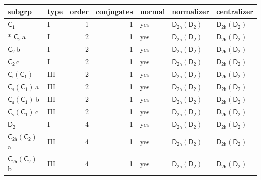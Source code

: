 \documentclass[10pt,a4paper]{article}
\numberwithin{equation}{section}
\newcommand{\grp}[1]{\mathsf{#1}}
\newcommand{\clsletter}[1]{\,{\scriptsize\color{black!55}#1}}
\begin{document}
{\small\begin{longtable}{@{}llrrlll@{}}\toprule
subgrp & type & order & conjugates & normal & normalizer & centralizer\\\midrule\endhead
\bottomrule\endfoot\endlastfoot
\href{../../../rotation/data/pdf/C1.pdf}{$\grp{C_{1}}$} & I & 1 & 1 & yes & \href{D2h-D2.pdf}{$\grp{D_{2h}}(\grp{D_{2}})$} & \href{D2h-D2.pdf}{$\grp{D_{2h}}(\grp{D_{2}})$}\\*
\href{../../../rotation/data/pdf/C2.pdf}{$\grp{C_{2}}$}\clsletter{a} & I & 2 & 1 & yes & \href{D2h-D2.pdf}{$\grp{D_{2h}}(\grp{D_{2}})$} & \href{D2h-D2.pdf}{$\grp{D_{2h}}(\grp{D_{2}})$}\\
\href{../../../rotation/data/pdf/C2.pdf}{$\grp{C_{2}}$}\clsletter{b} & I & 2 & 1 & yes & \href{D2h-D2.pdf}{$\grp{D_{2h}}(\grp{D_{2}})$} & \href{D2h-D2.pdf}{$\grp{D_{2h}}(\grp{D_{2}})$}\\
\href{../../../rotation/data/pdf/C2.pdf}{$\grp{C_{2}}$}\clsletter{c} & I & 2 & 1 & yes & \href{D2h-D2.pdf}{$\grp{D_{2h}}(\grp{D_{2}})$} & \href{D2h-D2.pdf}{$\grp{D_{2h}}(\grp{D_{2}})$}\\
\href{S2-C1.pdf}{$\grp{C_{i}}(\grp{C_{1}})$} & III & 2 & 1 & yes & \href{D2h-D2.pdf}{$\grp{D_{2h}}(\grp{D_{2}})$} & \href{D2h-D2.pdf}{$\grp{D_{2h}}(\grp{D_{2}})$}\\
\href{C1v-C1.pdf}{$\grp{C_{s}}(\grp{C_{1}})$}\clsletter{a} & III & 2 & 1 & yes & \href{D2h-D2.pdf}{$\grp{D_{2h}}(\grp{D_{2}})$} & \href{D2h-D2.pdf}{$\grp{D_{2h}}(\grp{D_{2}})$}\\
\href{C1v-C1.pdf}{$\grp{C_{s}}(\grp{C_{1}})$}\clsletter{b} & III & 2 & 1 & yes & \href{D2h-D2.pdf}{$\grp{D_{2h}}(\grp{D_{2}})$} & \href{D2h-D2.pdf}{$\grp{D_{2h}}(\grp{D_{2}})$}\\
\href{C1v-C1.pdf}{$\grp{C_{s}}(\grp{C_{1}})$}\clsletter{c} & III & 2 & 1 & yes & \href{D2h-D2.pdf}{$\grp{D_{2h}}(\grp{D_{2}})$} & \href{D2h-D2.pdf}{$\grp{D_{2h}}(\grp{D_{2}})$}\\
\href{../../../rotation/data/pdf/D2.pdf}{$\grp{D_{2}}$} & I & 4 & 1 & yes & \href{D2h-D2.pdf}{$\grp{D_{2h}}(\grp{D_{2}})$} & \href{D2h-D2.pdf}{$\grp{D_{2h}}(\grp{D_{2}})$}\\
\href{C2h-C2.pdf}{$\grp{C_{2h}}(\grp{C_{2}})$}\clsletter{a} & III & 4 & 1 & yes & \href{D2h-D2.pdf}{$\grp{D_{2h}}(\grp{D_{2}})$} & \href{D2h-D2.pdf}{$\grp{D_{2h}}(\grp{D_{2}})$}\\
\href{C2h-C2.pdf}{$\grp{C_{2h}}(\grp{C_{2}})$}\clsletter{b} & III & 4 & 1 & yes & \href{D2h-D2.pdf}{$\grp{D_{2h}}(\grp{D_{2}})$} & \href{D2h-D2.pdf}{$\grp{D_{2h}}(\grp{D_{2}})$}\\

\end{longtable}}
\end{document}
